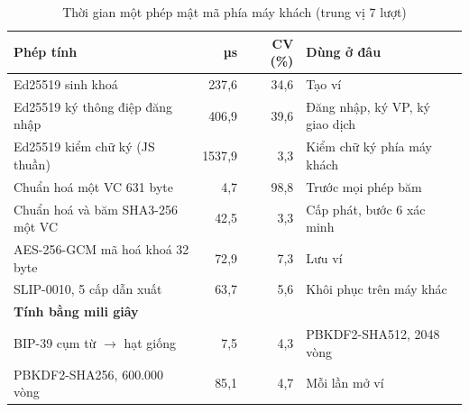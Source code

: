 \begin{table}[H]
\centering
\caption{Thời gian một phép mật mã phía máy khách (trung vị 7 lượt)}
\label{tab:v2-crypto}
\renewcommand{\arraystretch}{1.2}
\small
\begin{tabular}{|p{5.4cm}|r|r|p{4.6cm}|}
\hline
\textbf{Phép tính} & \textbf{µs} & \textbf{CV (\%)} & \textbf{Dùng ở đâu} \\ \hline
Ed25519 sinh khoá & 237{,}6 & 34{,}6 & Tạo ví \\ \hline
Ed25519 ký thông điệp đăng nhập & 406{,}9 & 39{,}6 & Đăng nhập, ký VP, ký giao dịch \\ \hline
Ed25519 kiểm chữ ký (JS thuần) & 1537{,}9 & 3{,}3 & Kiểm chữ ký phía máy khách \\ \hline
Chuẩn hoá một VC 631 byte & 4{,}7 & 98{,}8 & Trước mọi phép băm \\ \hline
Chuẩn hoá và băm SHA3-256 một VC & 42{,}5 & 3{,}3 & Cấp phát, bước 6 xác minh \\ \hline
AES-256-GCM mã hoá khoá 32 byte & 72{,}9 & 7{,}3 & Lưu ví \\ \hline
SLIP-0010, 5 cấp dẫn xuất & 63{,}7 & 5{,}6 & Khôi phục trên máy khác \\ \hline
\hline
\multicolumn{4}{|l|}{\textbf{Tính bằng mili giây}} \\ \hline
BIP-39 cụm từ $\rightarrow$ hạt giống & 7{,}5 & 4{,}3 & PBKDF2-SHA512, 2048 vòng \\ \hline
PBKDF2-SHA256, 600.000 vòng & 85{,}1 & 4{,}7 & Mỗi lần mở ví \\ \hline
\end{tabular}
\end{table}
